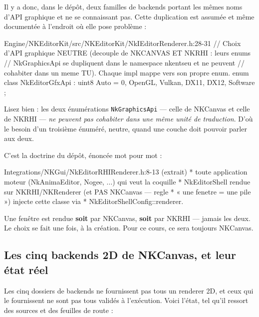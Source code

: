 Il y a donc, dans le dépôt, deux familles de backends portant les mêmes noms
d'API graphique et ne se connaissant pas. Cette duplication est assumée et même
documentée à l'endroit où elle pose problème :

\begin{nkcode}{Engine/NKEditorKit/src/NKEditorKit/NkIEditorRenderer.h:28-31}
// Choix d'API graphique NEUTRE (decouple de NKCANVAS ET NKRHI : leurs enums
// NkGraphicsApi se dupliquent dans le namespace nkentseu et ne peuvent
// cohabiter dans un meme TU). Chaque impl mappe vers son propre enum.
enum class NkEditorGfxApi : uint8 { Auto = 0, OpenGL, Vulkan, DX11, DX12, Software };
\end{nkcode}

\noindent Lisez bien : les deux énumérations \texttt{NkGraphicsApi} — celle de
NKCanvas et celle de NKRHI — \emph{ne peuvent pas cohabiter dans une même unité
de traduction}. D'où le besoin d'un troisième énuméré, neutre, quand une couche
doit pouvoir parler aux deux.

\begin{nkretenir}[Une fenêtre = une pile]
C'est la doctrine du dépôt, énoncée mot pour mot :

\begin{nkcode}{Integrations/NKGui/NkEditorRHIRenderer.h:8-13 (extrait)}
* toute application moteur (NkAnimaEditor, Nogee, ...) qui veut la coquille
* NkEditorShell rendue sur NKRHI/NKRenderer (et PAS NKCanvas — regle
* « une fenetre = une pile ») injecte cette classe via
* NkEditorShellConfig::renderer.
\end{nkcode}

Une fenêtre est rendue \textbf{soit} par NKCanvas, \textbf{soit} par NKRHI —
jamais les deux. Le choix se fait une fois, à la création. Pour ce cours, ce sera
toujours NKCanvas.
\end{nkretenir}

\subsection{Les cinq backends 2D de NKCanvas, et leur état réel}

Les cinq dossiers de backends ne fournissent pas tous un renderer 2D, et ceux
qui le fournissent ne sont pas tous validés à l'exécution. Voici l'état, tel
qu'il ressort des sources et des feuilles de route :

